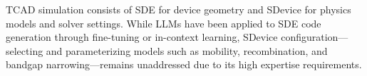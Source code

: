 TCAD simulation consists of SDE for device geometry and SDevice for physics models and solver settings. While LLMs have been applied to SDE code generation through fine-tuning or in-context learning, SDevice configuration---selecting and parameterizing models such as mobility, recombination, and bandgap narrowing---remains unaddressed due to its high expertise requirements.
